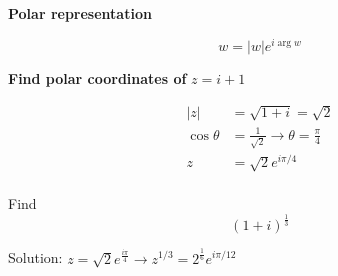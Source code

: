 \documentclass[10pt]{article}
\begin{document}
	\begin{remark}
		\textbf{Polar representation} 

		\begin{equation}
			w = |w| e^{i \arg w}
		\end{equation}


		\begin{example}
			\textbf{Find polar coordinates of}  $ z = i+1 $ 

			\begin{equation}
				\begin{split}
					|z| &= \sqrt{1+i} = \sqrt{2}    \\
					\cos \theta &= \frac{1}{\sqrt{2} } \rightarrow \theta = \frac{\pi}{4} \\
					z &= \sqrt{2} e^{i\pi/4}  \\
				\end{split}
			\end{equation}
			


		\end{example}
		

		\begin{example}
			Find \begin{equation}
				(1+i)^{\frac{1}{3}}
			\end{equation}

			Solution:
			$ z = \sqrt{2} e^{\frac{i\pi}{4}} \rightarrow z^{1/3} = 2^{\frac{1}{6}} e^{i\pi/12} $ 
			
		\end{example}
		
	\end{remark}
\end{document}

